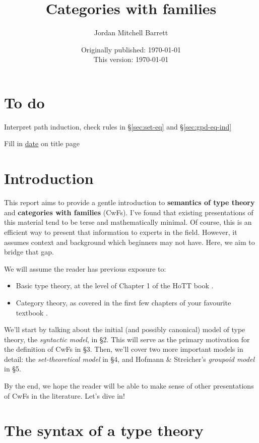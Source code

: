 \documentclass{article}
\title{Categories with families}
\author{Jordan Mitchell Barrett}
\date{Originally published: {\color{red}\label{todo:date} \today} \\[2mm] This version: \today}
\theoremstyle{definition}
\begin{document}
\maketitle
\tableofcontents


{\color{red}
\section*{To do}

Interpret path induction, check rules in \S\ref{sec:set-eq} and \S\ref{sec:gpd-eq-ind}

Fill in \hyperref[todo:date]{\underline{date}} on title page
}





\section{Introduction}

This report aims to provide a gentle introduction to \textbf{semantics of type theory} and \textbf{categories with families} (CwFs). I've found that existing presentations of this material tend to be terse and mathematically minimal. Of course, this is an efficient way to present that information to experts in the field. However, it assumes context and background which beginners may not have. Here, we aim to bridge that gap.

We will assume the reader has previous exposure to:
\begin{itemize}
    \item Basic type theory, at the level of Chapter 1 of the HoTT book \cite{hottbook}.
    
    \item Category theory, as covered in the first few chapters of your favourite textbook \cite{leinster, maclane}.
\end{itemize}

We'll start by talking about the initial (and possibly canonical) model of type theory, the \textit{syntactic model}, in \S2. This will serve as the primary motivation for the definition of CwFs in \S3. Then, we'll cover two more important models in detail: the \textit{set-theoretical model} in \S4, and Hofmann \& Streicher's \textit{groupoid model} \cite{gpoid} in \S5.

By the end, we hope the reader will be able to make sense of other presentations of CwFs in the literature. Let's dive in!


\section{The syntax of a type theory}
\label{sec:syntax}
\end{document}
